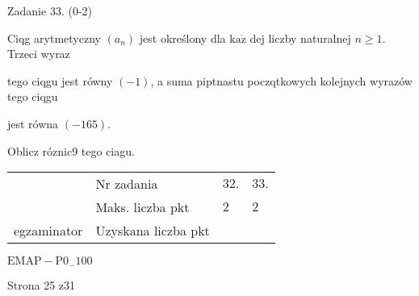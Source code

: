 \documentclass[a4paper,12pt]{article}
\begin{document}
Zadanie 33. (0-2)

Ciqg arytmetyczny $(a_{n})$ jest określony dla $\mathrm{k}\mathrm{a}\dot{\mathrm{z}}$ dej liczby naturalnej $n\geq 1$. Trzeci wyraz

tego ciqgu jest równy $(-1)$, a suma piptnastu poczqtkowych kolejnych wyrazów tego ciqgu

jest równa $(-165).$

Oblicz róznic9 tego ciagu.
\begin{center}
\begin{tabular}{|l|l|l|l|}
\cline{2-4}
&	\multicolumn{1}{|l|}{Nr zadania}&	\multicolumn{1}{|l|}{$32.$}&	\multicolumn{1}{|l|}{ $33.$}	\\
\cline{2-4}
&	\multicolumn{1}{|l|}{Maks. liczba pkt}&	\multicolumn{1}{|l|}{$2$}&	\multicolumn{1}{|l|}{ $2$}	\\
\cline{2-4}
\multicolumn{1}{|l|}{egzaminator}&	\multicolumn{1}{|l|}{Uzyskana liczba pkt}&	\multicolumn{1}{|l|}{}&	\multicolumn{1}{|l|}{}	\\
\hline
\end{tabular}

\end{center}
$\mathrm{E}\mathrm{M}\mathrm{A}\mathrm{P}-\mathrm{P}0_{-}100$

Strona 25 z31
\end{document}
